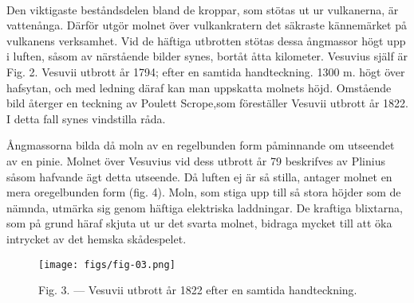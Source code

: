 \documentclass[a4paper, 12pt, oneside, swedish]{article}
\begin{document}
\paragraph{}
Den viktigaste beståndsdelen bland de kroppar, som stötas ut ur vulkanerna, är vattenånga. Därför utgör molnet över vulkankratern det säkraste kännemärket på vulkanens verksamhet. Vid de häftiga utbrotten stötas dessa ångmassor högt upp i luften, såsom av närstående bilder synes, bortåt åtta kilometer. Vesuvius själf är Fig. 2. Vesuvii utbrott år 1794; efter en samtida handteckning. 1300 m. högt över hafsytan, och med ledning däraf kan man uppskatta molnets höjd. Omstående bild återger en teckning av Poulett Scrope,som föreställer Vesuvii utbrott år 1822. I detta fall synes vindstilla råda.

Ångmassorna bilda då moln av en regelbunden form påminnande om utseendet av en pinie. Molnet över Vesuvius vid dess utbrott år 79 beskrifves av Plinius såsom hafvande ägt detta utseende. Då luften ej är så stilla, antager molnet en mera oregelbunden form (fig. 4). Moln, som stiga upp till så stora höjder som de nämnda, utmärka sig genom häftiga elektriska laddningar. De kraftiga blixtarna, som på grund häraf skjuta ut ur det svarta molnet, bidraga mycket till att öka intrycket av det hemska skådespelet.

\begin{figure}[H]
\centering
\texttt{[image: figs/fig-03.png]}
\caption{Fig. 3. --- Vesuvii utbrott år 1822 efter en samtida handteckning.}
\end{figure}
\end{document}
